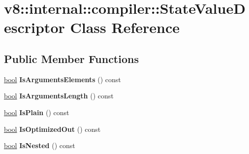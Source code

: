 \hypertarget{classv8_1_1internal_1_1compiler_1_1StateValueDescriptor}{}\section{v8\+:\+:internal\+:\+:compiler\+:\+:State\+Value\+Descriptor Class Reference}
\label{classv8_1_1internal_1_1compiler_1_1StateValueDescriptor}
\subsection*{Public Member Functions}
\begin{DoxyCompactItemize}
\item 
\mbox{\label{classv8_1_1internal_1_1compiler_1_1StateValueDescriptor_a14e71982371d04e18235c3a2462985a6}} 
\mbox{\hyperlink{classbool}{bool}} {\bfseries Is\+Arguments\+Elements} () const
\item 
\mbox{\label{classv8_1_1internal_1_1compiler_1_1StateValueDescriptor_a405475f34d13d4c756e62c1a4e98468c}} 
\mbox{\hyperlink{classbool}{bool}} {\bfseries Is\+Arguments\+Length} () const
\item 
\mbox{\label{classv8_1_1internal_1_1compiler_1_1StateValueDescriptor_a6b765b0830d6b69bd61eab6244380cd1}} 
\mbox{\hyperlink{classbool}{bool}} {\bfseries Is\+Plain} () const
\item 
\mbox{\label{classv8_1_1internal_1_1compiler_1_1StateValueDescriptor_ad66f354bfbf9dd9b5ab436989bc7dab7}} 
\mbox{\hyperlink{classbool}{bool}} {\bfseries Is\+Optimized\+Out} () const
\item 
\mbox{\label{classv8_1_1internal_1_1compiler_1_1StateValueDescriptor_abf9bf517f089c0d2bbddeab42ab627fb}} 
\mbox{\hyperlink{classbool}{bool}} {\bfseries Is\+Nested} () const
\item 
\mbox{\label{classv8_1_1internal_1_1compiler_1_1StateValueDescriptor_a42eb032be6d81884d87b607b7838653f}} 

\end{DoxyCompactItemize}
